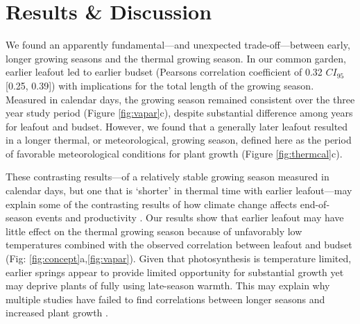 \documentclass{article}[12pt]
\begin{document}
\section{Results \& Discussion} 



We found an apparently fundamental---and unexpected trade-off---between early, longer growing seasons and the thermal growing season. In our common garden, earlier leafout led to earlier budset (Pearsons correlation coefficient of 0.32 $CI_{95}$[0.25, 0.39]) with  implications for the total length of the growing season. Measured in calendar days, the growing season remained consistent over the three year study period (Figure \ref{fig:vapar}c), despite substantial difference among years for leafout and budset. However, we found that a generally later leafout resulted in a longer thermal, or meteorological, growing season, defined here as the period of favorable meteorological conditions for plant growth \citep{Korner2023} (Figure \ref{fig:thermcal}c). 

These contrasting results---of a relatively stable growing season measured in calendar days, but one that is `shorter' in thermal time with earlier leafout---may explain some of the contrasting results of how climate change affects end-of-season events and productivity \citep{Zani2020}. Our results show that earlier leafout may have little effect on the thermal growing season because of unfavorably low temperatures combined with the observed correlation between leafout and budset (Fig: \ref{fig:concept}a,\ref{fig:vapar}). Given that photosynthesis is temperature limited, earlier springs appear to provide limited opportunity for substantial growth yet may deprive plants of fully using late-season warmth. This may explain why multiple studies have failed to find correlations between longer seasons and increased plant growth \citep{cufar2015variations,camarero2022decoupled,dow2022warm,silvestro2023longer}. %
\end{document}
